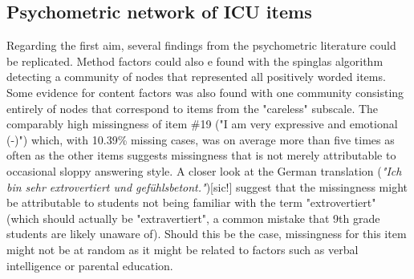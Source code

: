 \subsection{Psychometric network of ICU items}
Regarding the first aim, several findings from the psychometric literature could be replicated.
Method factors could also e found with the spinglas algorithm detecting a community of nodes that represented all positively worded items.
Some evidence for content factors was also found with one community consisting entirely of nodes that correspond to items from the "careless" subscale.
The comparably high missingness of item \#19 ("I am very expressive and emotional (-)") which, with 10.39\% missing cases, was on average more than five times as often as the other items suggests 
missingness that is not merely attributable to occasional sloppy answering style.
A closer look at the German translation (\textit{"Ich bin sehr extrovertiert und gefühlsbetont."})[sic!] suggest that the missingness might be attributable to
students not being familiar with the term "extrovertiert" (which should actually be "extravertiert", a common mistake that 9th grade students are likely unaware of).
Should this be the case, missingness for this item might not be at random as it might be related to factors such as verbal intelligence or parental education.

